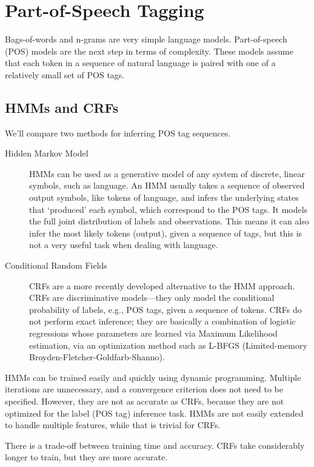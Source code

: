 \documentclass[10pt]{article}\usepackage{graphicx, color}
\begin{document}
\section{Part-of-Speech Tagging}

Bags-of-words and n-grams are very simple language models.
Part-of-speech (POS) models are the next step in terms of complexity.
These models assume that each token in a sequence of natural language is paired with one of a relatively small set of POS tags.

\subsection{HMMs and CRFs}

We'll compare two methods for inferring POS tag sequences.

\begin{description}
  \item[Hidden Markov Model] HMMs can be used as a generative model of any system of discrete, linear symbols, such as language. An HMM usually takes a sequence of observed output symbols, like tokens of language, and infers the underlying states that `produced' each symbol, which correspond to the POS tags. It models the full joint distribution of labels and observations. This means it can also infer the most likely tokens (output), given a sequence of tags, but this is not a very useful task when dealing with language.
  \item[Conditional Random Fields] CRFs are a more recently developed alternative to the HMM approach. CRFs are discriminative models---they only model the conditional probability of labels, e.g., POS tags, given a sequence of tokens. CRFs do not perform exact inference; they are basically a combination of logistic regressions whose parameters are learned via Maximum Likelihood estimation, via an optimization method such as L-BFGS (Limited-memory Broyden-Fletcher-Goldfarb-Shanno).
\end{description}

\noindent
HMMs can be trained easily and quickly using dynamic programming. Multiple iterations are unnecessary, and a convergence criterion does not need to be specified. However, they are not as accurate as CRFs, because they are not optimized for the label (POS tag) inference task. HMMs are not easily extended to handle multiple features, while that is trivial for CRFs.

There is a trade-off between training time and accuracy. CRFs take considerably longer to train, but they are more accurate.
\end{document}
